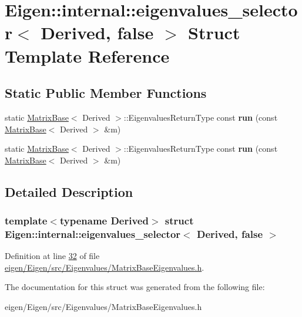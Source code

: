 \hypertarget{struct_eigen_1_1internal_1_1eigenvalues__selector_3_01_derived_00_01false_01_4}{}\section{Eigen\+:\+:internal\+:\+:eigenvalues\+\_\+selector$<$ Derived, false $>$ Struct Template Reference}
\label{struct_eigen_1_1internal_1_1eigenvalues__selector_3_01_derived_00_01false_01_4}
\subsection*{Static Public Member Functions}
\begin{DoxyCompactItemize}
\item 
\mbox{\label{struct_eigen_1_1internal_1_1eigenvalues__selector_3_01_derived_00_01false_01_4_ad8470d5c7d0c704771cdfdde4e495e2d}} 
static \hyperlink{group___core___module_class_eigen_1_1_matrix_base}{Matrix\+Base}$<$ Derived $>$\+::Eigenvalues\+Return\+Type const {\bfseries run} (const \hyperlink{group___core___module_class_eigen_1_1_matrix_base}{Matrix\+Base}$<$ Derived $>$ \&m)
\item 
\mbox{\label{struct_eigen_1_1internal_1_1eigenvalues__selector_3_01_derived_00_01false_01_4_ad8470d5c7d0c704771cdfdde4e495e2d}} 
static \hyperlink{group___core___module_class_eigen_1_1_matrix_base}{Matrix\+Base}$<$ Derived $>$\+::Eigenvalues\+Return\+Type const {\bfseries run} (const \hyperlink{group___core___module_class_eigen_1_1_matrix_base}{Matrix\+Base}$<$ Derived $>$ \&m)
\end{DoxyCompactItemize}


\subsection{Detailed Description}
\subsubsection*{template$<$typename Derived$>$\newline
struct Eigen\+::internal\+::eigenvalues\+\_\+selector$<$ Derived, false $>$}



Definition at line \hyperlink{eigen_2_eigen_2src_2_eigenvalues_2_matrix_base_eigenvalues_8h_source_l00032}{32} of file \hyperlink{eigen_2_eigen_2src_2_eigenvalues_2_matrix_base_eigenvalues_8h_source}{eigen/\+Eigen/src/\+Eigenvalues/\+Matrix\+Base\+Eigenvalues.\+h}.



The documentation for this struct was generated from the following file\+:\begin{DoxyCompactItemize}
\item 
eigen/\+Eigen/src/\+Eigenvalues/\+Matrix\+Base\+Eigenvalues.\+h\end{DoxyCompactItemize}
